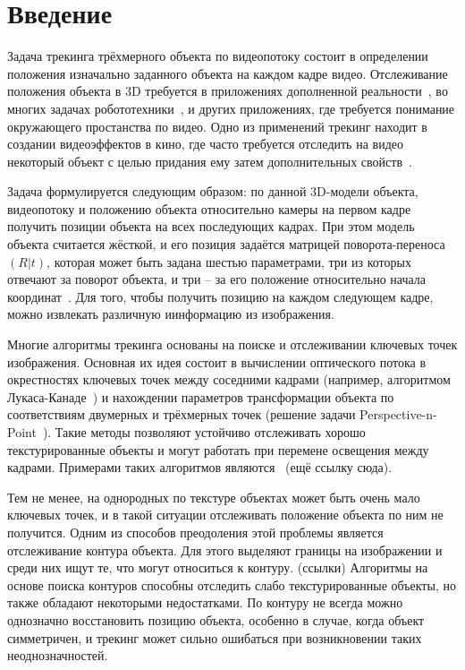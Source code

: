 \section{Введение}

Задача трекинга трёхмерного объекта по видеопотоку состоит в определении положения изначально заданного объекта на каждом кадре видео. Отслеживание положения объекта в 3D требуется в приложениях дополненной реальности~\cite{Radkowski}, во многих задачах робототехники~\cite{Robotics}, и других приложениях, где требуется понимание окружающего простанства по видео. Одно из применений трекинг находит в создании видеоэффектов в кино, где часто требуется отследить на видео некоторый объект с целью придания ему затем дополнительных свойств~\cite{Bugaev_2018_ECCV}.

Задача формулируется следующим образом: по данной 3D-модели объекта, видеопотоку и положению объекта относительно камеры на первом кадре получить позиции объекта на всех последующих кадрах. При этом модель объекта считается жёсткой, и его позиция задаётся матрицей поворота-переноса $(R | t)$, которая может быть задана шестью параметрами, три из которых отвечают за поворот объекта, и три -- за его положение относительно начала координат~\cite{TeorMech}. Для того, чтобы получить позицию на каждом следующем кадре, можно извлекать различную иинформацию из изображения. 

Многие алгоритмы трекинга основаны на поиске и отслеживании ключевых точек изображения. Основная их идея состоит в вычислении оптического потока в окрестностях ключевых точек между соседними кадрами (например, алгоритмом Лукаса-Канаде~\cite{LukasKanade}) и нахождении параметров трансформации объекта по соответствиям двумерных и трёхмерных точек (решение задачи Perspective-n-Point~\cite{PnPRansac}). Такие методы позволяют устойчиво отслеживать хорошо текстурированные объекты и могут работать при перемене освещения между кадрами. Примерами таких алгоритмов являются~\cite{LourakisFeatures} (ещё ссылку сюда). 

Тем не менее, на однородных по текстуре объектах может быть очень мало ключевых точек, и в такой ситуации отслеживать положение объекта по ним не получится. Одним из способов преодоления этой проблемы является отслеживание контура объекта. Для этого выделяют границы на изображении и среди них ищут те, что могут относиться к контуру. (ссылки)
Алгоритмы на основе поиска контуров способны отследить слабо текстурированные объекты, но также обладают некоторыми недостатками. По контуру не всегда можно однозначно восстановить позицию объекта, особенно в случае, когда объект симметричен, и трекинг может сильно ошибаться при возникновении таких неоднозначностей.

